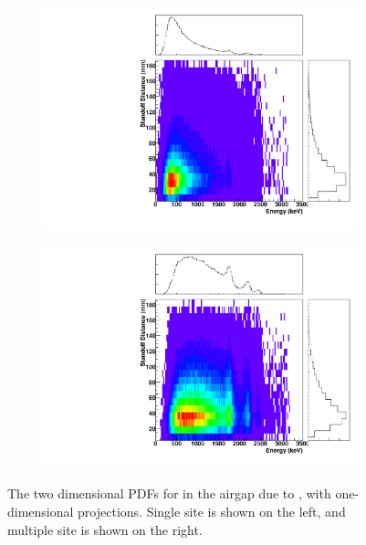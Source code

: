 \documentclass[herrin-thesis.tex]{subfiles}
\begin{document}
\begin{figure}[hp]
\centering
	\begin{subfigure}[b]{0.48\textwidth}
	\centering
	\includegraphics[width=\textwidth]{./plots/PDFs/analysis_pdf_AirGap_214_Bi_nochain_ss.pdf}
\end{subfigure}\hfill%
\begin{subfigure}[b]{0.48\textwidth}
	\centering
	\includegraphics[width=1\textwidth]{./plots/PDFs/analysis_pdf_AirGap_214_Bi_nochain_ms.pdf}
	\end{subfigure}
\caption[PDF for  in the airgap]{The two dimensional PDFs for  in the airgap due to , with one-dimensional projections. Single site is shown on the left, and multiple site is shown on the right.}
\label{fig:analysis_pdf_AirGap_214_Bi_nochain}
\end{figure}
\end{document}
